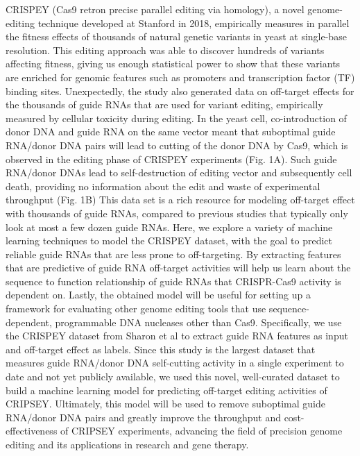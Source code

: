\documentclass[journal]{IEEEtran}
\begin{document}
CRISPEY (Cas9 retron precise parallel editing via homology), a novel genome-editing technique developed at Stanford in 2018, empirically measures in parallel the fitness effects of thousands of natural genetic variants in yeast at single-base resolution. This editing approach was able to discover hundreds of variants affecting fitness, giving us enough statistical power to show that these variants are enriched for genomic features such as promoters and transcription factor (TF) binding sites. Unexpectedly, the study also generated data on off-target effects for the thousands of guide RNAs that are used for variant editing, empirically measured by cellular toxicity during editing. In the yeast cell, co-introduction of donor DNA and guide RNA on the same vector meant that suboptimal guide RNA/donor DNA pairs will lead to cutting of the donor DNA by Cas9, which is observed in the editing phase of CRISPEY experiments (Fig. 1A). Such guide RNA/donor DNAs lead to self-destruction of editing vector and subsequently cell death, providing no information about the edit and waste of experimental throughput (Fig. 1B) This data set is a rich resource for modeling off-target effect with thousands of guide RNAs, compared to previous studies that typically only look at most a few dozen guide RNAs. Here, we explore a variety of machine learning techniques to model the CRISPEY dataset, with the goal to predict reliable guide RNAs that are less prone to off-targeting. By extracting features that are predictive of guide RNA off-target activities will help us learn about the sequence to function relationship of guide RNAs that CRISPR-Cas9 activity is dependent on. Lastly, the obtained model will be useful for setting up a framework for evaluating other genome editing tools that use sequence-dependent, programmable DNA nucleases other than Cas9. Specifically, we use the CRISPEY dataset from Sharon et al to extract guide RNA features as input and off-target effect as labels. Since this study is the largest dataset that measures guide RNA/donor DNA self-cutting activity in a single experiment to date and not yet publicly available, we used this novel, well-curated dataset to build a machine learning model for predicting off-target editing activities of CRIPSEY. Ultimately, this model will be used to remove suboptimal guide RNA/donor DNA pairs and greatly improve the throughput and cost-effectiveness of CRIPSEY experiments, advancing the field of precision genome editing and its applications in research and gene therapy.


\end{document}
